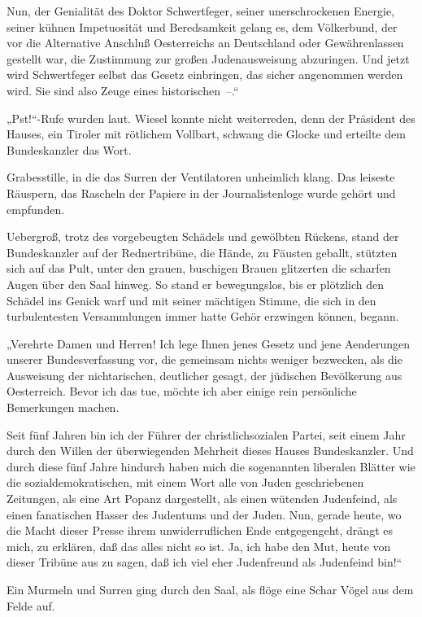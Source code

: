 Nun, der Genialität des Doktor Schwertfeger, seiner unerschrockenen
Energie, seiner kühnen Impetuosität und Beredsamkeit gelang es, dem
Völkerbund, der vor die Alternative Anschluß Oesterreichs an
Deutschland oder Gewährenlassen gestellt war, die Zustimmung zur
großen Judenausweisung abzuringen. Und jetzt wird Schwertfeger
selbst das Gesetz einbringen, das sicher angenommen werden wird.
Sie sind also Zeuge eines historischen~–.“

„Pst!“-Rufe wurden laut. Wiesel konnte nicht weiterreden, denn der
Präsident des Hauses, ein Tiroler mit  rötlichem
Vollbart, schwang die Glocke und erteilte dem Bundeskanzler das
Wort.

Grabesstille, in die das Surren der Ventilatoren unheimlich klang.
Das leiseste Räuspern, das Rascheln der Papiere in der
Journalistenloge wurde gehört und empfunden.

Uebergroß, trotz des vorgebeugten Schädels und gewölbten Rückens,
stand der Bundeskanzler auf der Rednertribüne, die Hände, zu
Fäusten geballt, stützten sich auf das Pult, unter den grauen,
buschigen Brauen glitzerten die scharfen Augen über den Saal
hinweg. So stand er bewegungslos, bis er plötzlich den Schädel ins
Genick warf und mit seiner mächtigen Stimme, die sich in den
turbulentesten Versammlungen immer hatte Gehör erzwingen können,
begann.

„Verehrte Damen und Herren! Ich lege Ihnen jenes Gesetz und jene
Aenderungen unserer Bundesverfassung vor, die gemeinsam nichts
weniger bezwecken, als die Ausweisung der nichtarischen, deutlicher
gesagt, der jüdischen Bevölkerung aus Oesterreich. Bevor ich das
tue, möchte ich aber einige rein persönliche Bemerkungen machen.

Seit fünf Jahren bin ich der Führer der christlichsozialen Partei,
seit einem Jahr durch den Willen der überwiegenden Mehrheit dieses
Hauses Bundeskanzler. Und durch diese fünf Jahre hindurch haben
mich die sogenannten liberalen Blätter wie die
sozialdemokratischen, mit einem Wort alle von Juden geschriebenen
Zeitungen, als eine Art Popanz dargestellt, als einen wütenden
 Judenfeind, als einen fanatischen Hasser des
Judentums und der Juden. Nun, gerade heute, wo die Macht dieser
Presse ihrem unwiderruflichen Ende entgegengeht, drängt es mich, zu
erklären, daß das alles nicht so ist. Ja, ich habe den Mut, heute
von dieser Tribüne aus zu sagen, daß ich viel eher Judenfreund als
Judenfeind bin!“

Ein Murmeln und Surren ging durch den Saal, als flöge eine Schar
Vögel aus dem Felde auf.

